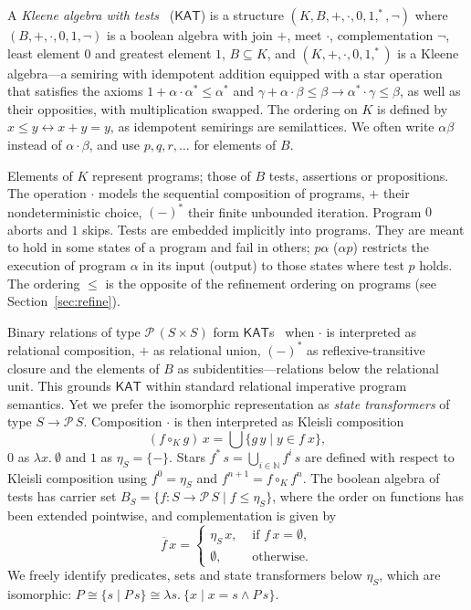 \documentclass[envcountsame]{llncs}
\newcommand{\KAT}{\mathsf{KAT}}
\newcommand{\Pow}{\mathcal{P}}
\begin{document}
A \emph{Kleene algebra with tests}~\cite{Kozen97} ($\KAT$) is a
structure $(K,B,+,\cdot,0,1,^\ast,\neg)$ where $(B,+,\cdot,0,1,\neg)$
is a boolean algebra with join $+$, meet $\cdot$, complementation
$\neg$, least element $0$ and greatest element $1$, $B\subseteq K$,
and $(K,+,\cdot,0,1,^\ast)$ is a Kleene algebra---a semiring with
idempotent addition equipped with a star operation that satisfies the
axioms $1+\alpha\cdot\alpha^\ast \le \alpha^\ast$ and
$\gamma+\alpha\cdot \beta\le \beta\rightarrow \alpha^\ast \cdot
\gamma\le \beta$,
as well as their opposities, with multiplication swapped.  The
ordering on $K$ is defined by $x\le y\leftrightarrow x+y=y$, as
idempotent semirings are semilattices. We often write $\alpha\beta$
instead of $\alpha\cdot\beta$, and use $p,q,r,\dots$ for elements of $B$.

Elements of $K$ represent programs; those of $B$ tests, assertions or
propositions.  The operation $\cdot$ models the sequential composition
of programs, $+$ their nondeterministic choice, $(-)^\ast$ their
finite unbounded iteration. Program $0$ aborts and $1$ skips.  Tests
are embedded implicitly into programs. They are meant to hold in some
states of a program and fail in others; $p\alpha$ ($\alpha p$)
restricts the execution of program $\alpha$ in its input (output) to
those states where test $p$ holds. The ordering $\le$ is the opposite
of the refinement ordering on programs (see Section~\ref{sec:refine}).

Binary relations of type $\Pow\, (S\times S)$ form
$\KAT$s~\cite{Kozen97} when $\cdot$ is interpreted as relational
composition, $+$ as relational union, $(-)^\ast$ as
reflexive-transitive closure and the elements of $B$ as
subidentities---relations below the relational unit. This grounds
$\KAT$ within standard relational imperative program semantics. Yet we
prefer the isomorphic representation as \emph{state transformers} of
type $S\to \Pow\, S$.  Composition $\cdot$ is then interpreted as
Kleisli composition
\begin{equation*} 
(f\circ_K g)\, x = \bigcup\{g\, y\mid y \in f\ x \}, 
\end{equation*} 
$0$ as $\lambda x.\ \emptyset$ and $1$ as $\eta_S = \{-\}$.  Stars
$f^{\ast}\, s  = \bigcup_{i\in\mathbb{N}} f^i\, s$ are defined with
  respect to Kleisli composition using $f^{0} = \eta_S$ and
  $f^{n+1} = f \circ_K f^{n}$. The boolean algebra of tests has
  carrier set $B_S=\{f:S\to \Pow\, S \mid f\le \eta_S\}$, where the
  order on functions has been extended pointwise,  and complementation
  is given by
  \begin{equation*} 
    \overline{f}\, x =
  \begin{cases}
    \eta_S\, x, & \text{ if } f\, x = \emptyset,\\
\emptyset, & \text{ otherwise}.
  \end{cases}
\end{equation*}
We freely identify predicates, sets and state 
transformers below $\eta_S$, which are isomorphic:
$P\cong \{s\mid P\, s\}\cong \lambda s.\ \{x\mid x=s \land P\, s\}$.
\end{document}
